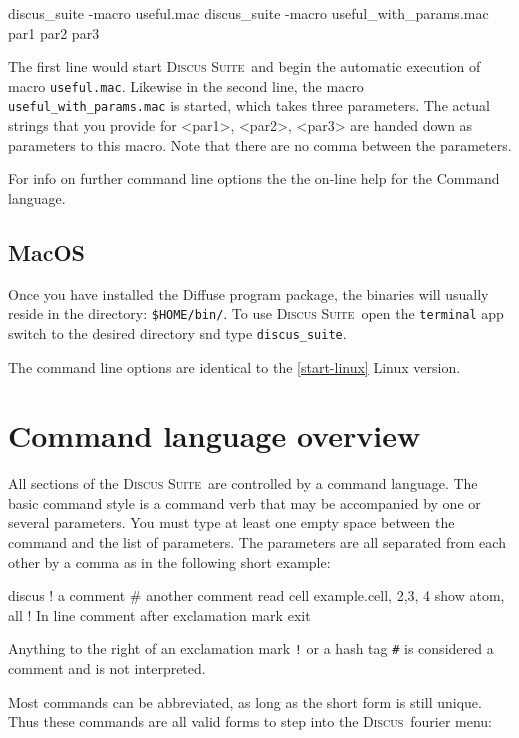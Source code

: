 \documentclass[11pt]{report}
\newcommand{\Discus}{\textsc{Discus\ }}
\newcommand{\Suite}{\textsc{Discus Suite\ }}
\begin{document}
\begin{MacVerbatim}
discus_suite -macro useful.mac  
discus_suite -macro useful_with_params.mac  par1 par2 par3
\end{MacVerbatim}

The first line would start \Suite and begin the automatic execution
of macro {\tt useful.mac}. Likewise in the second line, the macro
{\tt useful\_with\_params.mac} is started, which takes three parameters.
The actual strings that
you provide for <par1>, <par2>, <par3> are handed down as parameters to 
this macro. Note that there are no comma between the parameters.

For info on further command line options the the on-line help for
the Command language.

\subsection{MacOS} \label{start-MAC}
Once you have installed the Diffuse program package, the binaries will
usually reside in the directory: {\tt \${HOME}/bin/}.  
To use \Suite open the {\tt terminal} app switch to the desired
directory snd type {\tt discus\_suite}.

The command line options are identical to the \ref{start-linux} Linux version.


\section{Command language overview} \label{over}

All sections of the \Suite are controlled by a command language. The
basic command style is a command verb that may be accompanied by one 
or several parameters. You must type at least one empty space between
the command and the list of parameters. The parameters are all 
separated from each other by a comma as in the following short example: 

\begin{MacVerbatim}
  discus
  ! a comment
  # another comment
  read
  cell example.cell, 2,3, 4
  show atom, all   ! In line comment after exclamation mark
  exit
\end{MacVerbatim}

Anything to the right of an exclamation mark {\tt !} or a hash tag
{\tt \#} is considered a comment and is not interpreted. 

Most commands can be abbreviated, as long as the short form is
still unique. Thus these commands are all valid forms to 
step into the \Discus fourier menu:
\end{document}
